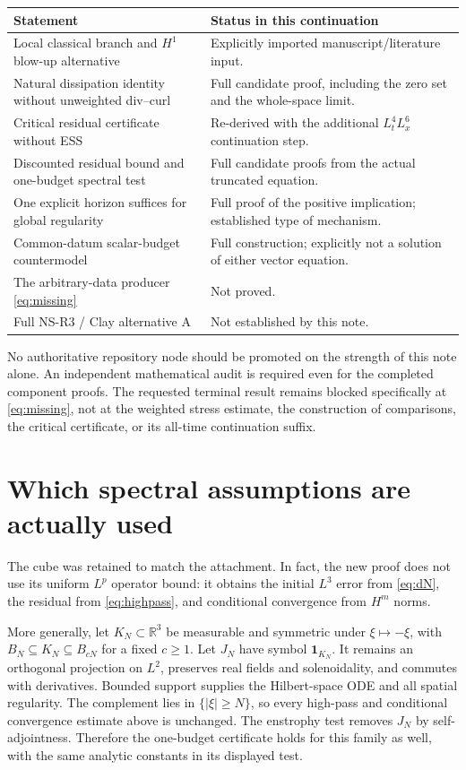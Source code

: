 \documentclass[11pt,a4paper]{article}
\theoremstyle{definition}\newtheorem{definition}[theorem]{Definition}
\theoremstyle{remark}\newtheorem{remark}[theorem]{Remark}
\newcommand{\R}{\mathbb R}
\numberwithin{equation}{section}
\begin{document}
\begin{center}\small
\begin{tabular}{@{}>{\raggedright\arraybackslash}p{91mm}>{\raggedright\arraybackslash}p{63mm}@{}}\toprule
Statement & Status in this continuation\\\midrule
Local classical branch and $H^1$ blow-up alternative & Explicitly imported manuscript/literature input.\\[3pt]
Natural dissipation identity without unweighted div--curl & Full candidate proof, including the zero set and the whole-space limit.\\[3pt]
Critical residual certificate without ESS & Re-derived with the additional $L^4_tL^6_x$ continuation step.\\[3pt]
Discounted residual bound and one-budget spectral test & Full candidate proofs from the actual truncated equation.\\[3pt]
One explicit horizon suffices for global regularity & Full proof of the positive implication; established type of mechanism.\\[3pt]
Common-datum scalar-budget countermodel & Full construction; explicitly not a solution of either vector equation.\\[3pt]
The arbitrary-data producer \eqref{eq:missing} & Not proved.\\[3pt]
Full NS-R3 / Clay alternative A & Not established by this note.\\\bottomrule
\end{tabular}
\end{center}
No authoritative repository node should be promoted on the strength of this note alone. An independent mathematical audit is required even for the completed component proofs. The requested terminal result remains blocked specifically at \eqref{eq:missing}, not at the weighted stress estimate, the construction of comparisons, the critical certificate, or its all-time continuation suffix.

\appendix
\section{Which spectral assumptions are actually used}
\label{app:cutoffs}
The cube was retained to match the attachment. In fact, the new proof does not use its uniform $L^p$ operator bound: it obtains the initial $L^3$ error from \eqref{eq:dN}, the residual from \eqref{eq:highpass}, and conditional convergence from $H^m$ norms.

More generally, let $K_N\subset\R^3$ be measurable and symmetric under $\xi\mapsto-\xi$, with $B_N\subseteq K_N\subseteq B_{cN}$ for a fixed $c\ge1$. Let $J_N$ have symbol $\mathbf1_{K_N}$. It remains an orthogonal projection on $L^2$, preserves real fields and solenoidality, and commutes with derivatives. Bounded support supplies the Hilbert-space ODE and all spatial regularity. The complement lies in $\{|\xi|\ge N\}$, so every high-pass and conditional convergence estimate above is unchanged. The enstrophy test removes $J_N$ by self-adjointness. Therefore the one-budget certificate holds for this family as well, with the same analytic constants in its displayed test.
\end{document}
